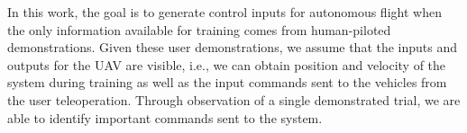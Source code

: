 \documentclass[letterpaper, 10 pt, conference]{ieeeconf}  %
\newcommand\NB[1]{$\spadesuit$\footnote{NB: #1}}
\begin{document}
In this work, the goal is to generate control inputs for autonomous flight when the only information available for training comes from human-piloted demonstrations. Given these user demonstrations, we assume that the inputs and outputs for the UAV are visible, i.e., we can obtain position and velocity of the system during training as well as the input commands sent to the vehicles from the user teleoperation. 
Through observation of a single demonstrated trial, we are able to identify important commands sent to the system. 
\end{document}
